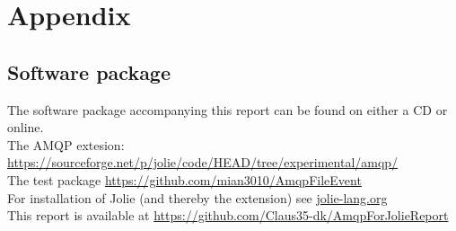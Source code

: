 \section{Appendix}
\subsection{Software package}
The software package accompanying this report can be found on either a CD or online.\\
The AMQP extesion:
\url{https://sourceforge.net/p/jolie/code/HEAD/tree/experimental/amqp/}\\
The test package
\url{https://github.com/mian3010/AmqpFileEvent}\\
For installation of Jolie (and thereby the extension) see \url{jolie-lang.org}\\
This report is available at \url{https://github.com/Claus35-dk/AmqpForJolieReport}
\newpage
